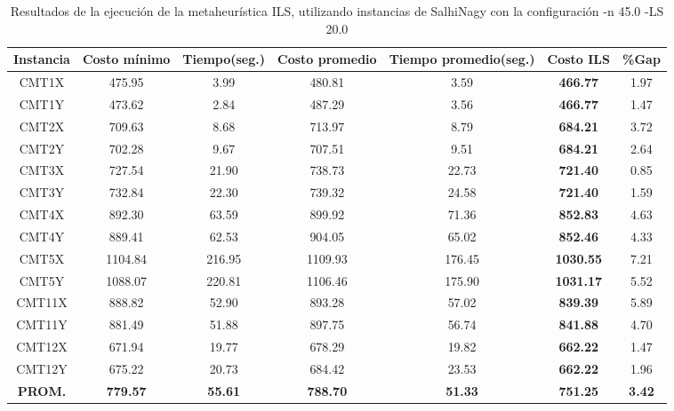 \begin{table}[ht]
\caption{Resultados de la ejecución de la metaheurística ILS, utilizando instancias de SalhiNagy con la configuración -n 45.0 -LS 20.0}
\centering
\small
\begin{tabular}{c c c c c c c}
\hline\hline
Instancia & Costo mínimo & Tiempo(seg.) & Costo promedio & Tiempo promedio(seg.) & Costo ILS & \%Gap \\ [0.5ex]
\hline
CMT1X & 475.95 & 3.99 & 
480.81 & 3.59 & \bf{466.77} & 
1.97\\CMT1Y & 473.62 & 2.84 & 
487.29 & 3.56 & \bf{466.77} & 
1.47\\CMT2X & 709.63 & 8.68 & 
713.97 & 8.79 & \bf{684.21} & 
3.72\\CMT2Y & 702.28 & 9.67 & 
707.51 & 9.51 & \bf{684.21} & 
2.64\\CMT3X & 727.54 & 21.90 & 
738.73 & 22.73 & \bf{721.40} & 
0.85\\CMT3Y & 732.84 & 22.30 & 
739.32 & 24.58 & \bf{721.40} & 
1.59\\CMT4X & 892.30 & 63.59 & 
899.92 & 71.36 & \bf{852.83} & 
4.63\\CMT4Y & 889.41 & 62.53 & 
904.05 & 65.02 & \bf{852.46} & 
4.33\\CMT5X & 1104.84 & 216.95 & 
1109.93 & 176.45 & \bf{1030.55} & 
7.21\\CMT5Y & 1088.07 & 220.81 & 
1106.46 & 175.90 & \bf{1031.17} & 
5.52\\CMT11X & 888.82 & 52.90 & 
893.28 & 57.02 & \bf{839.39} & 
5.89\\CMT11Y & 881.49 & 51.88 & 
897.75 & 56.74 & \bf{841.88} & 
4.70\\CMT12X & 671.94 & 19.77 & 
678.29 & 19.82 & \bf{662.22} & 
1.47\\CMT12Y & 675.22 & 20.73 & 
684.42 & 23.53 & \bf{662.22} & 
1.96\\\bf{PROM.} & 
\bf{779.57} & \bf{55.61} & \bf{788.70} & \bf{51.33} & \bf{751.25} & \bf{3.42}\\[1ex]\hline
\end{tabular}
\label{table:nonlin}
\end{table} \clearpage
